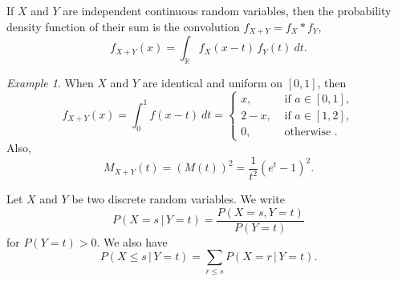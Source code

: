 \documentclass[11pt]{article}
\def\R{\mathbb{R}}
\theoremstyle{definition}
\theoremstyle{remark}
\newtheorem*{example}{Example}
\numberwithin{equation}{module}
\begin{document}
    \begin{theorem}
        If $X$ and $Y$ are independent continuous random variables, then the
        probability density function of their sum is the convolution $f_{X + Y} =
        f_X * f_Y$, \[
            f_{X + Y}(x) = \int_{\R} f_X(x - t)\,f_Y(t)\:dt.
        \] 
    \end{theorem}
    \begin{example}
        When $X$ and $Y$ are identical and uniform on $[0, 1]$, then \[
            f_{X + Y}(x) = \int_0^1 f(x - t) \:dt = \begin{cases}
                x, &\text{ if }a\in [0, 1], \\
                2 - x, &\text{ if }a\in [1, 2], \\
                0, &\text{ otherwise }.
            \end{cases}
        \] Also, \[
            M_{X + Y}(t) = (M(t))^2 = \frac{1}{t^2}(e^t - 1)^2.
        \] 
    \end{example}

    \begin{definition}
        Let $X$ and $Y$ be two discrete random variables. We write \[
            P(X = s\,|\, Y = t) = \frac{P(X = s, Y = t)}{P(Y = t)}
        \] for $P(Y = t) > 0$. We also have \[
            P(X \leq s \,|\, Y = t) = \sum_{r \leq s}P(X = r\,|\, Y = t).
        \] 
    \end{definition}
    
\end{document}
